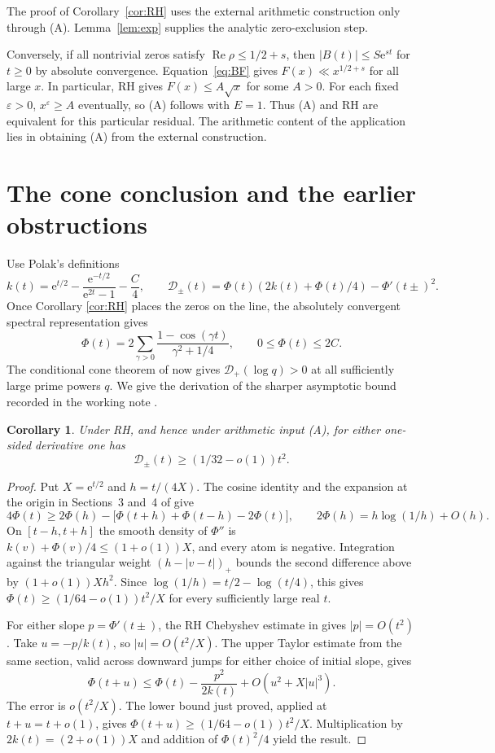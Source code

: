 \documentclass[11pt,a4paper]{article}
\newtheorem{corollary}[theorem]{Corollary}
\theoremstyle{remark}\newtheorem{remark}[theorem]{Remark}
\newcommand{\e}{\mathrm e}
\newcommand{\D}{\mathcal D}
\newcommand{\Rea}{\operatorname{Re}}
\begin{document}
The proof of Corollary~\ref{cor:RH} uses the external arithmetic
construction only through (A). Lemma~\ref{lem:exp} supplies the
analytic zero-exclusion step.

Conversely, if all nontrivial zeros satisfy \(\Rea\rho\le1/2+s\),
then \(|B(t)|\le S\e^{st}\) for \(t\ge0\) by absolute convergence.
Equation~\eqref{eq:BF} gives \(F(x)\ll x^{1/2+s}\) for all large \(x\).
In particular, RH gives \(F(x)\le A\sqrt{x}\) for some \(A>0\).
For each fixed \(\varepsilon>0\), \(x^\varepsilon\ge A\) eventually,
so (A) follows with \(E=1\). Thus (A) and RH are equivalent for
this particular residual. The arithmetic content of the application
lies in obtaining (A) from the external construction.

\section{The cone conclusion and the earlier obstructions}
Use Polak's definitions
\[
 k(t)=\e^{t/2}-\frac{\e^{-t/2}}{\e^{2t}-1}-\frac C4,
 \qquad
 \D_\pm(t)=\Phi(t)(2k(t)+\Phi(t)/4)-\Phi'(t\pm)^2.
\]
Once Corollary \ref{cor:RH} places the zeros on the line,
the absolutely convergent spectral representation gives
\begin{equation}
 \Phi(t)=2\sum_{\gamma>0}
      \frac{1-\cos(\gamma t)}{\gamma^2+1/4},
 \qquad 0\le\Phi(t)\le2C.\label{eq:phibound}
\end{equation}
The conditional cone theorem of \cite{Polak} now gives
\(\D_+(\log q)>0\) at all sufficiently large prime powers
\(q\). We give the derivation of the sharper asymptotic bound
recorded in the working note \cite{PreviousNote}.
\begin{corollary}\label{cor:margin}
Under RH, and hence under arithmetic input (A), for either one-sided
derivative one has
\[
 \D_\pm(t)\ge(1/32-o(1))t^2.
\]
\end{corollary}
\begin{proof}
Put \(X=\e^{t/2}\) and \(h=t/(4X)\). The cosine identity and the
expansion at the origin in Sections~3 and~4 of \cite{Polak} give
\[
 4\Phi(t)\ge2\Phi(h)-\bigl[\Phi(t+h)+\Phi(t-h)-2\Phi(t)\bigr],
 \qquad 2\Phi(h)=h\log(1/h)+O(h).
\]
On \([t-h,t+h]\) the smooth density of \(\Phi''\) is
\(k(v)+\Phi(v)/4\le(1+o(1))X\), and every atom is negative.
Integration against the triangular weight \((h-|v-t|)_+\) bounds
the second difference above by \((1+o(1))Xh^2\). Since
\(\log(1/h)=t/2-\log(t/4)\), this gives
\(\Phi(t)\ge(1/64-o(1))t^2/X\) for every sufficiently large real \(t\).

For either slope \(p=\Phi'(t\pm)\), the RH Chebyshev estimate in
\cite[Section~4]{Polak} gives \(|p|=O(t^2)\). Take \(u=-p/k(t)\), so
\(|u|=O(t^2/X)\). The upper Taylor estimate from the same section,
valid across downward jumps for either choice of initial slope, gives
\[
 \Phi(t+u)\le\Phi(t)-\frac{p^2}{2k(t)}
                       +O(u^2+X|u|^3).
\]
The error is \(o(t^2/X)\). The lower bound just proved, applied at
\(t+u=t+o(1)\), gives
\(\Phi(t+u)\ge(1/64-o(1))t^2/X\). Multiplication by
\(2k(t)=(2+o(1))X\) and addition of \(\Phi(t)^2/4\) yield the result.
\end{proof}
\end{document}
